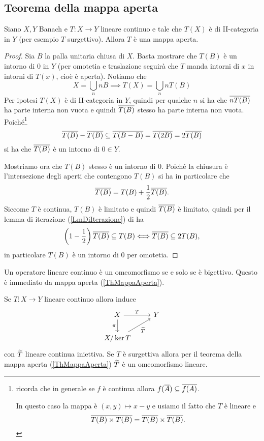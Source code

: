 \subsection{Teorema della mappa aperta}

\begin{theorem}\label{ThMappaAperta}
Siano $X,Y$ Banach e $T:X\to Y$ lineare continuo e tale che $T(X)$ \`e di II-categoria in $Y$ (per esempio $T$ surgettivo). Allora $T$ \`e una mappa aperta.
\end{theorem}
\begin{proof}
Sia $B$ la palla unitaria chiusa di $X$. Basta mostrare che $T(B)$ \`e un intorno di $0$ in $Y$ (per omotetia e traslazione seguir\`a che $T$ manda intorni di $x$ in intorni di $T(x)$, cio\`e \`e aperta). Notiamo che 
\[X=\bigcup_n nB\implies T(X)=\bigcup_n nT(B)\]
Per ipotesi $T(X)$ \`e di II-categoria in $Y$, quindi per qualche $n$ si ha che $\overline{n T(B)}$ ha parte interna non vuota e quindi $\overline{T(B)}$ stesso ha parte interna non vuota. Poich\'e\footnote{ricorda che in generale se $f$ \`e continua allora $f(\overline{A})\subseteq \overline{f(A)}$. 

In questo caso la mappa \`e $(x,y)\mapsto x-y$ e usiamo il fatto che $T$ \`e lineare e \[\overline{T(B)\times T(B)}=\overline{T(B)}\times \overline{T(B)}.\]} 
\[\overline{T(B)}-\overline{T(B)}\subseteq \overline{T(B-B)}=\overline{T(2B)}=2\overline{T(B)}\]
si ha che $\overline{T(B)}$ \`e un intorno di $0\in Y$.


Mostriamo ora che $T(B)$ stesso \`e un intorno di $0$. Poich\'e la chiusura \`e l'intersezione degli aperti che contengono $T(B)$ si ha in particolare che
\[\overline{T(B)}=T(B)+\frac12\overline{T(B)}.\]
Siccome $T$ \`e continua, $T(B)$ \`e limitato e quindi $\overline{T(B)}$ \`e limitato, quindi per il lemma di iterazione (\ref{LmDiIterazione}) di ha
\[\left({1-\frac12}\right)\overline{T(B)}\subseteq T(B)\Longleftrightarrow \overline{T(B)}\subseteq 2T(B),\]
in particolare $T(B)$ \`e un intorno di $0$ per omotetia.
\end{proof}

\begin{remark}
Un operatore lineare continuo \`e un omeomorfismo se e solo se \`e bigettivo. Questo \`e immediato da mappa aperta (\ref{ThMappaAperta}).
\end{remark}

\begin{remark}
Se $T:X\to Y$ lineare continuo allora induce
\[\begin{tikzcd}
	X & Y \\
	{X/\ker T}
	\arrow["T", from=1-1, to=1-2]
	\arrow["\pi"', from=1-1, to=2-1]
	\arrow["{\wt T}"', from=2-1, to=1-2]
\end{tikzcd}\]
con $\widetilde{T}$ lineare continua iniettiva. Se $T$ \`e surgettiva allora per il teorema della mappa aperta (\ref{ThMappaAperta}) $\widetilde{T}$ \`e un omeomorfismo lineare.
\end{remark}

